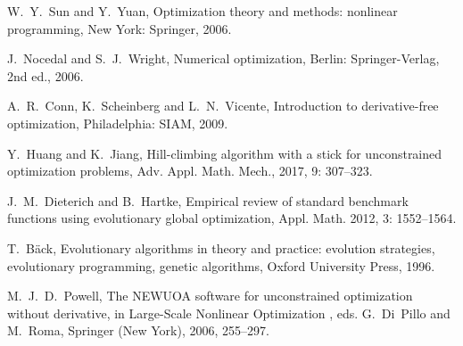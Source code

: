 \documentclass[mathpazo]{csam}
\theoremstyle{remark}
\begin{document}
\begin{thebibliography}{99}

W.~Y.~Sun and Y.~Yuan,
Optimization theory and methods: nonlinear programming,
New York: Springer, 2006.


J.~Nocedal and S.~J.~Wright,
Numerical optimization, 
Berlin: Springer-Verlag, 2nd ed., 2006.

A.~R.~Conn, K.~Scheinberg and L.~N.~Vicente,
Introduction to derivative-free optimization,
Philadelphia: SIAM, 2009.

{Y.~Huang and K.~Jiang,}
{Hill-climbing algorithm with a stick for unconstrained optimization problems},
{Adv. Appl. Math. Mech.},
2017, 9: 307--323.

J.~M.~Dieterich and B.~Hartke, 
Empirical review of standard benchmark functions using evolutionary global optimization,
{Appl. Math.} 2012, 3: 1552--1564.

T.~B{\"a}ck, 
Evolutionary algorithms in theory and practice: evolution
  strategies, evolutionary programming, genetic algorithms,
Oxford University Press, 1996.

M.~J.~D.~Powell,
The NEWUOA software for unconstrained optimization without derivative, in
Large-Scale Nonlinear Optimization , eds. G.~Di~Pillo
and M.~Roma, Springer (New York), 2006, 255--297.



\end{thebibliography}
\end{document}
